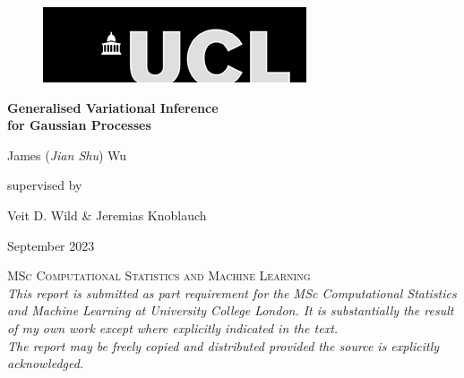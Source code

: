 \documentclass{article}
\numberwithin{equation}{section}
\begin{document}
\onehalfspacing
\begin{titlepage}
	\centering
\begin{figure}[h!]
\begin{flushright}
    \includegraphics[width=.333\textwidth]{ucl_logo.png}
\end{flushright}
\end{figure}
    {}
	\vspace{3cm}

	{\Huge\bfseries Generalised Variational Inference \\ for Gaussian Processes\par}

	\vspace{1cm}
	{\LARGE James (\textit{Jian Shu}) Wu\par}
	\vspace{0.5cm}
	supervised by\par
    \Large{Veit D. Wild \& Jeremias Knoblauch}\\
	\vfill
	{\large September 2023\par}
 \textsc{MSc Computational Statistics and Machine Learning}\\
	\vspace{1cm}
 \textit{\scriptsize{This report is submitted as part requirement for the MSc Computational Statistics and Machine Learning at University College London. It is substantially the result of my own work except where explicitly indicated in the text. \\ The report may be freely copied and distributed provided the source is explicitly acknowledged.}}


\end{titlepage}
\newpage
\setcounter{page}{1}



\end{document}
